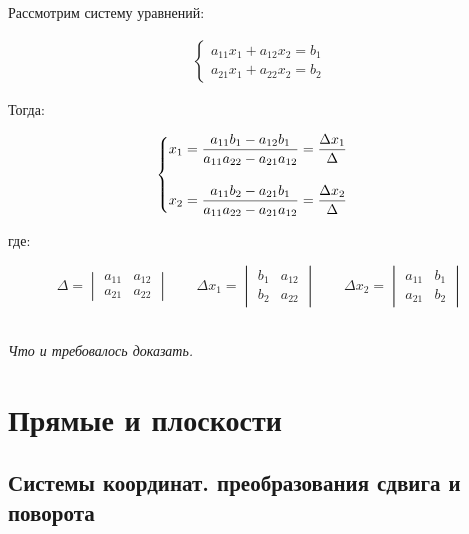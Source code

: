 \documentclass[a4paper,12pt,oneside]{extbook}
\newcommand{\newpar}{$ $\par\nobreak\ignorespaces}
\theoremstyle{numbered}
\theoremstyle{unnumbered}
\theoremstyle{named}
\theoremstyle{unnumbered}
\theoremstyle{named}
\theoremstyle{named}
\theoremstyle{named}
\renewenvironment{proof}[1][]{\breakenv[Доказательство]{\if\relax\detokenize{#1}\relax\else\;\fi}{\textbf{#1}}}{\smallskip\newpar \hfill\textit{Что и требовалось доказать.}}
\begin{document}
\begin{proof}

    Рассмотрим систему уравнений:

    \begin{gather*}
        \begin{cases}
            a_{11}x_1 + a_{12}x_2 = b_1 \\
            a_{21}x_1 + a_{22}x_2 = b_2
        \end{cases}
    \end{gather*}

    Тогда:

    \begin{gather*}
        \begin{cases}
            x_1 = \dfrac{a_{11}b_1 - a_{12}b_1}{a_{11}a_{22} - a_{21}a_{12}} = \dfrac{\Delta{x_1}}{\Delta}
            \vspace{0.5cm} \\
            x_2 = \dfrac{a_{11}b_2 - a_{21}b_1}{a_{11}a_{22} - a_{21}a_{12}} = \dfrac{\Delta{x_2}}{\Delta}
        \end{cases}
    \end{gather*}

    где:

    \begin{equation*}
        \Delta =
        \begin{vmatrix}
            a_{11} & a_{12} \\
            a_{21} & a_{22}
        \end{vmatrix}
        \qquad
        \Delta{x_1} =
        \begin{vmatrix}
            b_{1} & a_{12} \\
            b_{2} & a_{22}
        \end{vmatrix}
        \qquad
        \Delta{x_2} =
        \begin{vmatrix}
            a_{11} & b_{1} \\
            a_{21} & b_{2}
        \end{vmatrix}
    \end{equation*}
\end{proof}

\chapter{Прямые и плоскости}%
\label{cha:Прямые и плоскости}

\section{Системы координат. преобразования сдвига и поворота}
\label{sec:coordinate_systems}
\end{document}
